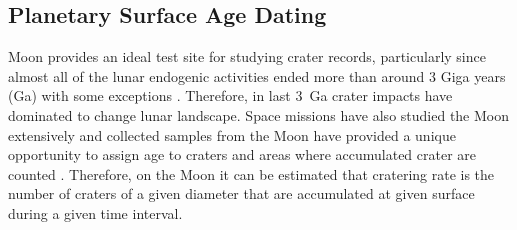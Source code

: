 \documentclass[11pt]{article}
\begin{document}

\subsection{Planetary Surface Age Dating}
Moon provides an ideal test site for studying crater records, particularly since almost all of the lunar endogenic activities ended more than around 3 Giga years (Ga) with some exceptions \cite{hiesinger2000ages}. Therefore, in last \SI{3}{Ga}  crater impacts have dominated to change lunar landscape. Space missions have also studied the Moon extensively and collected samples from the Moon have provided a unique opportunity to assign age to craters and areas where accumulated crater are counted \cite{stoffler2001stratigraphy}. Therefore, on the Moon it can be estimated that cratering rate is the number of craters of a given diameter that are accumulated at given surface during a given time interval.
\end{document}
